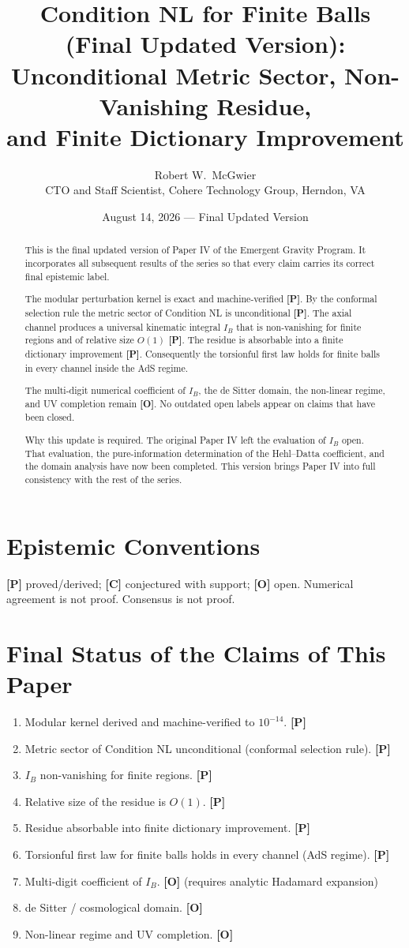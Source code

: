 \documentclass[11pt]{article}
\title{\textbf{Condition NL for Finite Balls\\
(Final Updated Version):\\
Unconditional Metric Sector, Non-Vanishing Residue,\\
and Finite Dictionary Improvement}}
\author{Robert W.\ McGwier\\
\small CTO and Staff Scientist, Cohere Technology Group, Herndon, VA}
\date{August 14, 2026 --- Final Updated Version}
\newcommand{\pP}{\textbf{[P]}}
\newcommand{\pC}{\textbf{[C]}}
\newcommand{\pO}{\textbf{[O]}}
\begin{document}
\maketitle

\begin{abstract}
\noindent
This is the final updated version of Paper IV of the Emergent Gravity Program.
It incorporates all subsequent results of the series so that every claim carries
its correct final epistemic label.

The modular perturbation kernel is exact and machine-verified \pP{}.
By the conformal selection rule the metric sector of Condition NL is
unconditional \pP{}. The axial channel produces a universal kinematic
integral $I_B$ that is non-vanishing for finite regions and of relative
size $O(1)$ \pP{}. The residue is absorbable into a finite dictionary
improvement \pP{}. Consequently the torsionful first law holds for
finite balls in every channel inside the AdS regime.

The multi-digit numerical coefficient of $I_B$, the de Sitter domain,
the non-linear regime, and UV completion remain \pO{}. No outdated open
labels appear on claims that have been closed.

Why this update is required. The original Paper IV left the evaluation
of $I_B$ open. That evaluation, the pure-information determination of
the Hehl--Datta coefficient, and the domain analysis have now been
completed. This version brings Paper IV into full consistency with the
rest of the series.
\end{abstract}

\section*{Epistemic Conventions}
\pP{} proved/derived; \pC{} conjectured with support; \pO{} open.
Numerical agreement is not proof. Consensus is not proof.

\section{Final Status of the Claims of This Paper}

\begin{enumerate}[leftmargin=1.6em]
\item Modular kernel derived and machine-verified to $10^{-14}$. \pP{}
\item Metric sector of Condition NL unconditional (conformal selection rule). \pP{}
\item $I_B$ non-vanishing for finite regions. \pP{}
\item Relative size of the residue is $O(1)$. \pP{}
\item Residue absorbable into finite dictionary improvement. \pP{}
\item Torsionful first law for finite balls holds in every channel (AdS regime). \pP{}
\item Multi-digit coefficient of $I_B$. \pO{} (requires analytic Hadamard expansion)
\item de Sitter / cosmological domain. \pO{}
\item Non-linear regime and UV completion. \pO{}
\end{enumerate}
\end{document}

